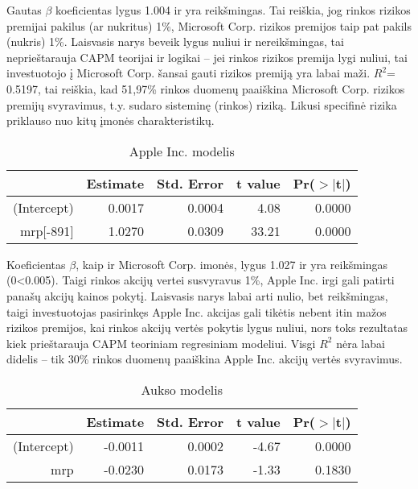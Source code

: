 \documentclass[12pt, a14paper, lithuanian]{article}
\begin{document}
Gautas $\beta$ koeficientas lygus 1.004 ir yra reikšmingas. Tai reiškia, jog rinkos rizikos premijai pakilus (ar nukritus) 1\%, Microsoft Corp. rizikos premijos taip pat pakils (nukris) 1\%. Laisvasis narys beveik lygus nuliui ir nereikšmingas,
tai neprieštarauja CAPM teorijai ir logikai -- jei rinkos rizikos premija lygi nuliui, tai investuotojo į Microsoft Corp. šansai gauti rizikos premiją yra labai maži.
$R^2$= 0.5197, tai reiškia, kad 51,97\% rinkos duomenų paaiškina Microsoft Corp. rizikos premijų svyravimus, t.y. sudaro sisteminę (rinkos) riziką. Likusi specifinė rizika priklauso nuo kitų įmonės charakteristikų.

\begin{table}[ht]
\begin{center}
\begin{tabular}{rrrrr}
  \hline
 & Estimate & Std. Error & t value & Pr($>$$|$t$|$) \\ 
  \hline
(Intercept) & 0.0017 & 0.0004 & 4.08 & 0.0000 \\ 
  mrp[-891] & 1.0270 & 0.0309 & 33.21 & 0.0000 \\ 
   \hline
\end{tabular}
\end{center}
\caption{Apple Inc. modelis}
\end{table}

Koeficientas $\beta$, kaip ir Microsoft Corp. imonės, lygus 1.027 ir yra reikšmingas (0<0.005). Taigi rinkos akcijų vertei susvyravus 1\%, Apple
Inc. irgi gali patirti panašų akcijų kainos pokytį. Laisvasis narys labai arti nulio, bet reikšmingas,
taigi investuotojas pasirinkęs Apple Inc. akcijas gali tikėtis nebent itin mažos rizikos premijos, kai rinkos akcijų vertės
pokytis lygus nuliui, nors toks rezultatas kiek prieštarauja CAPM teoriniam regresiniam modeliui.
Visgi  $R^2$ nėra labai didelis -- tik 30\% rinkos duomenų paaiškina Apple Inc. akcijų vertės svyravimus.

\begin{table}[ht]
\begin{center}
\begin{tabular}{rrrrr}
  \hline
 & Estimate & Std. Error & t value & Pr($>$$|$t$|$) \\ 
  \hline
(Intercept) & -0.0011 & 0.0002 & -4.67 & 0.0000 \\ 
  mrp & -0.0230 & 0.0173 & -1.33 & 0.1830 \\ 
   \hline
\end{tabular}
\end{center}
\caption{Aukso modelis}
\end{table}
\end{document}

